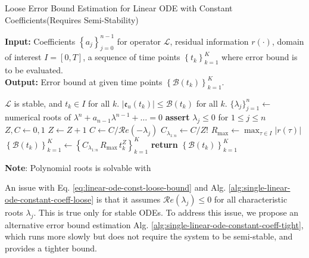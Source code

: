 \documentclass[accepted]{uai2023}
\newcommand{\Err}{\mathfrak{e}}
\newcommand{\Bound}{\mathcal{B}}
\renewcommand{\L}{\mathcal{L}}
\renewcommand{\Re}[1]{\mathcal{R}e\left(#1\right)}
\begin{document}
    \begin{algorithm}
        \small
        \caption{Loose Error Bound Estimation for Linear ODE with Constant Coefficients\quad (Requires Semi-Stability)}\label{alg:single-linear-ode-constant-coeff-loose}
        \textbf{Input:} Coefficients $\left\{a_j\right\}_{j=0}^{n-1}$ for operator $\L$, residual information $r(\cdot)$, domain of interest $I = [0, T]$, a sequence of time points $\left\{t_k\right\}_{k=1}^{K}$ where error bound is to be evaluated.\\
        \textbf{Output:} Error bound at given time points $\left\{\Bound(t_k)\right\}_{k=1}^{K}$.

        \begin{algorithmic}
            \Require $\L$ is stable, and $t_k \in I$ for all $k$.
            \Ensure $\left|\Err_u(t_k)\right| \leq \Bound(t_k)$ for all $k$. 
            \State $\{\lambda_j\}_{j=1}^{n} \gets$ numerical roots of $\lambda^n+a_{n-1}\lambda^{n-1}+\dots=0$ 
            \State \textbf{assert} $\lambda_j \leq 0$ for $1 \leq j \leq n$ 
            \State $Z, C \gets 0, 1$
                \If{$\Re{\lambda_j} = 0$}
                    \State $Z \gets Z + 1$
                \Else
                    \State $C \gets C / \Re{-\lambda_j}$
                \EndIf
            \EndFor
            \State $C_{\lambda_{1:n}}\gets C / Z!$
            \State $R_{\max} \gets \max_{\tau \in I} |r(\tau)|$ 
            \State $\left\{\Bound(t_k)\right\}_{k=1}^{K} \gets \left\{C_{\lambda_{1:n}}\, R_{\max}\, t_k^{Z}\right\}_{k=1}^{K}$
            \State \textbf{return} $\left\{\Bound(t_k)\right\}_{k=1}^{K}$
        \end{algorithmic}
        \vspace{0.5em} 
        \textbf{Note}: Polynomial roots is solvable with \cite{jenkins1970three}
    \end{algorithm}

    An issue with Eq. \ref{eq:linear-ode-const-loose-bound} and Alg. \ref{alg:single-linear-ode-constant-coeff-loose} is that it assumes $\Re{\lambda_j} \leq 0$ for all characteristic roots $\lambda_j$. 
    This is true only for stable ODEs. 
    To address this issue, we propose an alternative error bound estimation Alg. \ref{alg:single-linear-ode-constant-coeff-tight}, which runs more slowly but does not require the system to be semi-stable, and provides a tighter bound.
\end{document}
